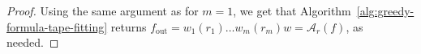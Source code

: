 \begin{proof}
    Using the same argument as for $m=1$, we get that Algorithm~\ref{alg:greedy-formula-tape-fitting} returns $f_\text{out} = w_1 (r_1) \dots w_m (r_m) w = \mathcal{A}_r(f)$, as needed.




\end{proof}





